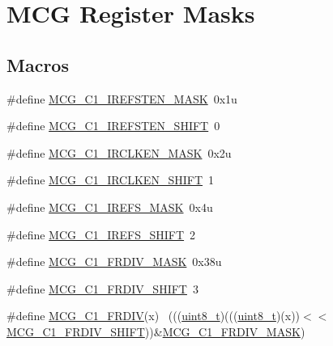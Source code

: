 \hypertarget{group___m_c_g___register___masks}{}\section{M\+CG Register Masks}
\label{group___m_c_g___register___masks}
\subsection*{Macros}
\begin{DoxyCompactItemize}
\item 
\#define \hyperlink{group___m_c_g___register___masks_ga275f9145f8c55ff4c836cbd20ab06139}{M\+C\+G\+\_\+\+C1\+\_\+\+I\+R\+E\+F\+S\+T\+E\+N\+\_\+\+M\+A\+SK}~0x1u
\item 
\#define \hyperlink{group___m_c_g___register___masks_ga10e0a80bfe715350aba6d5f5212617bc}{M\+C\+G\+\_\+\+C1\+\_\+\+I\+R\+E\+F\+S\+T\+E\+N\+\_\+\+S\+H\+I\+FT}~0
\item 
\#define \hyperlink{group___m_c_g___register___masks_ga50398d9dc80a3016fddc6a2aef3df994}{M\+C\+G\+\_\+\+C1\+\_\+\+I\+R\+C\+L\+K\+E\+N\+\_\+\+M\+A\+SK}~0x2u
\item 
\#define \hyperlink{group___m_c_g___register___masks_ga2c4305645e7c2b3977dcd0d35c7eaab9}{M\+C\+G\+\_\+\+C1\+\_\+\+I\+R\+C\+L\+K\+E\+N\+\_\+\+S\+H\+I\+FT}~1
\item 
\#define \hyperlink{group___m_c_g___register___masks_gadc14970d17e8ee736a16805a412a87fe}{M\+C\+G\+\_\+\+C1\+\_\+\+I\+R\+E\+F\+S\+\_\+\+M\+A\+SK}~0x4u
\item 
\#define \hyperlink{group___m_c_g___register___masks_gada376a938782b95d20788418a2564476}{M\+C\+G\+\_\+\+C1\+\_\+\+I\+R\+E\+F\+S\+\_\+\+S\+H\+I\+FT}~2
\item 
\#define \hyperlink{group___m_c_g___register___masks_gac7762b84f41121882f4d1fbcaa839aeb}{M\+C\+G\+\_\+\+C1\+\_\+\+F\+R\+D\+I\+V\+\_\+\+M\+A\+SK}~0x38u
\item 
\#define \hyperlink{group___m_c_g___register___masks_gaee124d0ce81f6e815dbbcac62440708b}{M\+C\+G\+\_\+\+C1\+\_\+\+F\+R\+D\+I\+V\+\_\+\+S\+H\+I\+FT}~3
\item 
\#define \hyperlink{group___m_c_g___register___masks_gae985172a227b87028daa388a2d8f5c93}{M\+C\+G\+\_\+\+C1\+\_\+\+F\+R\+D\+IV}(x)                                                ~(((\hyperlink{_p_e___types_8h_aba7bc1797add20fe3efdf37ced1182c5}{uint8\+\_\+t})(((\hyperlink{_p_e___types_8h_aba7bc1797add20fe3efdf37ced1182c5}{uint8\+\_\+t})(x))$<$$<$\hyperlink{group___m_c_g___register___masks_gaee124d0ce81f6e815dbbcac62440708b}{M\+C\+G\+\_\+\+C1\+\_\+\+F\+R\+D\+I\+V\+\_\+\+S\+H\+I\+FT}))\&\hyperlink{group___m_c_g___register___masks_gac7762b84f41121882f4d1fbcaa839aeb}{M\+C\+G\+\_\+\+C1\+\_\+\+F\+R\+D\+I\+V\+\_\+\+M\+A\+SK})
$$
\end{DoxyCompactItemize}
